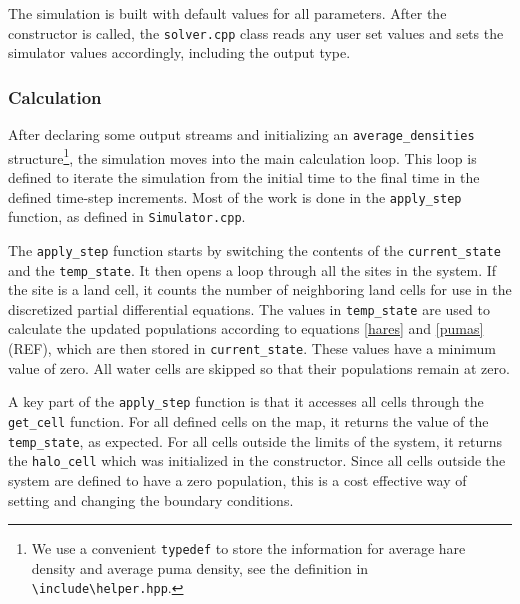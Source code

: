\documentclass[a4paper,11pt]{article}
\begin{document}
The simulation is built with default values for all parameters.  After the constructor is called, the \texttt{solver.cpp} class reads any user set values and sets the simulator values accordingly, including the output type.

\subsubsection{Calculation}

After declaring some output streams and initializing an \texttt{average\_densities} structure\footnote{We use a convenient \texttt{typedef} to store the information for average hare density and average puma density, see the definition in \texttt{\textbackslash include\textbackslash helper.hpp}.}, the simulation moves into the main calculation loop.  This loop is defined to iterate the simulation from the initial time to the final time in the defined time-step increments.  Most of the work is done in the \texttt{apply\_step} function, as defined in \texttt{Simulator.cpp}.  

The  \texttt{apply\_step} function starts by switching the contents of the  \texttt{current\_state} and the \texttt{temp\_state}.  It then opens a loop through all the sites in the system.  If the site is a land cell, it counts the number of neighboring land cells for use in the discretized partial differential equations.  The values in \texttt{temp\_state} are used to calculate the updated populations according to equations \eqref{hares} and \eqref{pumas} (REF), which are then stored in \texttt{current\_state}.  These values have a minimum value of zero.  All water cells are skipped so that their populations remain at zero.

A key part of the \texttt{apply\_step} function is that it accesses all cells through the \texttt{get\_cell} function.  For all defined cells on the map, it returns the value of the \texttt{temp\_state}, as expected.  For all cells outside the limits of the system, it returns the \texttt{halo\_cell} which was initialized in the constructor.  Since all cells outside the system are defined to have a zero population, this is a cost effective way of setting and changing the boundary conditions.

\end{document}
